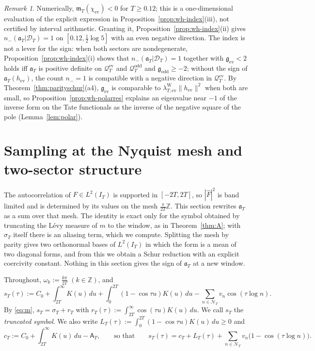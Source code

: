 \documentclass[11pt]{amsart}
\theoremstyle{definition}
\theoremstyle{remark}
\newtheorem{remark}[theorem]{Remark}
\newcommand{\Z}{\mathbb Z}
\newcommand{\IT}{I_T}
\newcommand{\sT}{\sigma_T}
\newcommand{\Fh}{\widehat F}
\newcommand{\NT}{\mathcal N_T}
\newcommand{\Aconst}{\mathsf A_T}
\newcommand{\mT}{\mathfrak m_T}
\begin{document}
\begin{remark}\label{rem:wh-index}
Numerically, $\mT(\chi_{\mathrm{ev}})<0$ for $T\ge0.12$; this is a one-dimensional evaluation of the explicit
expression in Proposition~\ref{prop:wh-index}(iii), not certified by interval arithmetic. Granting it,
Proposition~\ref{prop:wh-index}(ii) gives $n_-(\mathfrak a_T|\mathcal D_T)=1$ on $[0.12,\frac12\log5]$ with an even negative
direction. The index is not a lever for the sign: when both sectors are nondegenerate,
Proposition~\ref{prop:wh-index}(i) shows that $n_-(\mathfrak a_T|\mathcal D_T)=1$ together with $\mathfrak g_{\mathrm{ev}}<2$ holds iff
$\mathfrak a_T$ is positive definite on $\mathcal Q^{\mathrm{ev}}_T$ and $\mathcal Q^{\mathrm{odd}}_T$ and $\mathfrak g_{\mathrm{odd}}\ge-2$; without the
sign of $\mathfrak a_T(h_{\mathrm{ev}})$, the count $n_-=1$ is compatible with a negative direction in $\mathcal Q^{\mathrm{ev}}_T$. By
Theorem~\ref{thm:parityschur}(a4), $\mathfrak g_{\mathrm{ev}}$ is comparable to $\lambda^{\mathrm W}_{T,\mathrm{ev}}\|h_{\mathrm{ev}}\|^2$ when both
are small, so Proposition~\ref{prop:wh-polarres} explains an eigenvalue near $-1$ of the inverse form on the
Tate functionals as the inverse of the negative square of the pole (Lemma~\ref{lem:polar}).
\end{remark}


\section{Sampling at the Nyquist mesh and two-sector structure}\label{sec:nyq}

The autocorrelation of $F\in L^2(\IT)$ is supported in $[-2T,2T]$, so $|\Fh|^2$ is band limited and is
determined by its values on the mesh $\frac{\pi}{2T}\Z$. This section rewrites $\mathfrak a_T$ as a sum over
that mesh. The identity is exact only for the symbol obtained by truncating the L\'evy measure of $m$ to the
window, as in Theorem~\ref{thm:A}; with $\sT$ itself there is an aliasing term, which we compute. Splitting the
mesh by parity gives two orthonormal bases of $L^2(\IT)$ in which the form is a mean of two diagonal forms,
and from this we obtain a Schur reduction with an explicit coercivity constant. Nothing in this section gives
the sign of $\mathfrak a_T$ at a new window.

Throughout, $\omega_k:=\frac{k\pi}{2T}$ $(k\in\Z)$, and
\begin{equation}\label{eq:nyq-sT}
s_T(\tau):=C_0+\int_{2T}^\infty K(u)\,du+\int_0^{2T}(1-\cos\tau u)K(u)\,du-\sum_{n\in\NT}v_n\cos(\tau\log n).
\end{equation}
By \eqref{eq:m}, $s_T=\sT+r_T$ with $r_T(\tau):=\int_{2T}^\infty\cos(\tau u)K(u)\,du$. We call $s_T$ the
\emph{truncated symbol}. We also write $L_T(\tau):=\int_0^{2T}(1-\cos\tau u)K(u)\,du\ge0$ and
\[
c_T:=C_0+\int_{2T}^\infty K(u)\,du-\Aconst,\qquad\text{so that}\qquad
s_T(\tau)=c_T+L_T(\tau)+\sum_{n\in\NT}v_n\big(1-\cos(\tau\log n)\big).
\]
\end{document}
